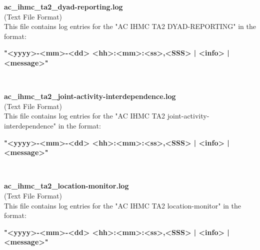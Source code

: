 \begin{description}
\begin{addmargin}[0em]{0em}
    \label{ac_ihmc_ta2_dyad-reporting.log}
    \begin{addmargin}[1em]{0em} %
        \textbf{ac\_ihmc\_ta2\_dyad-reporting.log}\\
        (Text File Format)\\
        This file contains log entries for the "AC IHMC TA2 DYAD-REPORTING" in the format:
        \begin{addmargin}[1em]{0em}
            \textbf{"<yyyy>-<mm>-<dd> <hh>:<mm>:<ss>,<SSS> | <info> | <message>"}
        \end{addmargin}
    \end{addmargin} %
    \textbf{\\}

    \label{ac_ihmc_ta2_joint-activity-interdependence.log}
    \begin{addmargin}[1em]{0em} %
        \textbf{ac\_ihmc\_ta2\_joint-activity-interdependence.log}\\
        (Text File Format)\\
        This file contains log entries for the "AC IHMC TA2 joint-activity-interdependence" in the format:
        \begin{addmargin}[1em]{0em}
            \textbf{"<yyyy>-<mm>-<dd> <hh>:<mm>:<ss>,<SSS> | <info> | <message>"}
        \end{addmargin}
    \end{addmargin} %
    \textbf{\\}

    \label{ac_ihmc_ta2_location-monitor.log}
    \begin{addmargin}[1em]{0em} %
        \textbf{ac\_ihmc\_ta2\_location-monitor.log}\\
        (Text File Format)\\
        This file contains log entries for the "AC IHMC TA2 location-monitor" in the format:
        \begin{addmargin}[1em]{0em}
            \textbf{"<yyyy>-<mm>-<dd> <hh>:<mm>:<ss>,<SSS> | <info> | <message>"}
        \end{addmargin}
    \end{addmargin} %
    \textbf{\\}


\end{addmargin}
\end{description}
